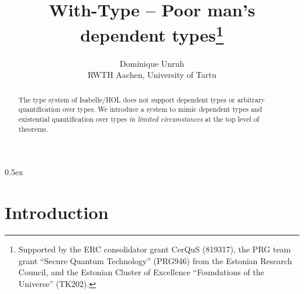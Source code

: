 \documentclass[11pt,a4paper]{article}
\begin{document}
\title{With-Type -- Poor man's dependent types\thanks{Supported by the ERC consolidator grant CerQuS (819317), the PRG team grant “Secure Quantum Technology” (PRG946) from the Estonian Research Council, and the Estonian Cluster of Excellence ``Foundations of the Universe'' (TK202).}}
\author{Dominique Unruh\\
 \footnotesize RWTH Aachen, University of Tartu}
\maketitle

\begin{abstract}
  The type system of Isabelle/HOL does not support dependent types or arbitrary quantification over types.
  We introduce a system to mimic dependent types and existential quantification over types \emph{in limited circumstances} at the top level of theorems.
\end{abstract}

\tableofcontents

\parindent 0pt\parskip 0.5ex

\section{Introduction}
\end{document}
